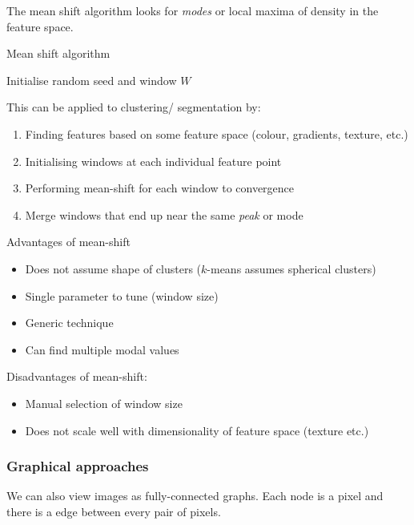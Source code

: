 \documentclass{article}
\begin{document}
The mean shift algorithm looks for \textit{modes} or local maxima of density in the feature space.

\begin{algorithm}
  \caption{Mean shift algorithm}
  Initialise random seed and window $W$

\end{algorithm}

This can be applied to clustering/ segmentation by:

\begin{enumerate}
  \item Finding features based on some feature space (colour, gradients, texture, etc.)
  \item Initialising windows at each individual feature point
  \item Performing mean-shift for each window to convergence
  \item Merge windows that end up near the same \textit{peak} or mode
\end{enumerate}

Advantages of mean-shift

\begin{itemize}
  \item Does not assume shape of clusters ($k$-means assumes spherical clusters)
  \item Single parameter to tune (window size)
  \item Generic technique
  \item Can find multiple modal values
\end{itemize}

Disadvantages of mean-shift:

\begin{itemize}
  \item Manual selection of window size
        \item Does not scale well with dimensionality of feature space (texture etc.)
\end{itemize}

\subsubsection{Graphical approaches}

We can also view images as fully-connected graphs. Each node is a pixel and there is a edge between every pair of pixels.
\end{document}
